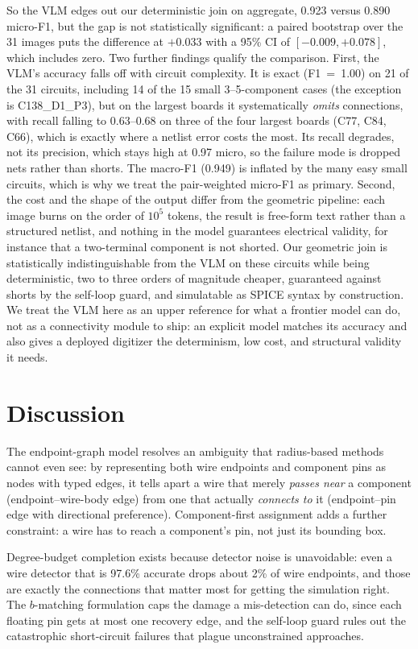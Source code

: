 \documentclass{ieeeaccess}
\begin{document}
So the VLM edges out our deterministic join on aggregate, 0.923 versus 0.890 micro-F1, but the gap is not statistically significant: a paired bootstrap over the 31 images puts the difference at $+0.033$ with a 95\% CI of $[-0.009, +0.078]$, which includes zero. Two further findings qualify the comparison. First, the VLM's accuracy falls off with circuit complexity. It is exact (F1~=~1.00) on 21 of the 31 circuits, including 14 of the 15 small 3--5-component cases (the exception is C138\_D1\_P3), but on the largest boards it systematically \emph{omits} connections, with recall falling to 0.63--0.68 on three of the four largest boards (C77, C84, C66), which is exactly where a netlist error costs the most. Its recall degrades, not its precision, which stays high at 0.97 micro, so the failure mode is dropped nets rather than shorts. The macro-F1 (0.949) is inflated by the many easy small circuits, which is why we treat the pair-weighted micro-F1 as primary. Second, the cost and the shape of the output differ from the geometric pipeline: each image burns on the order of $10^5$ tokens, the result is free-form text rather than a structured netlist, and nothing in the model guarantees electrical validity, for instance that a two-terminal component is not shorted. Our geometric join is statistically indistinguishable from the VLM on these circuits while being deterministic, two to three orders of magnitude cheaper, guaranteed against shorts by the self-loop guard, and simulatable as SPICE syntax by construction. We treat the VLM here as an upper reference for what a frontier model can do, not as a connectivity module to ship: an explicit model matches its accuracy and also gives a deployed digitizer the determinism, low cost, and structural validity it needs.

\section{Discussion}

The endpoint-graph model resolves an ambiguity that radius-based methods cannot even see: by representing both wire endpoints and component pins as nodes with typed edges, it tells apart a wire that merely \emph{passes near} a component (endpoint--wire-body edge) from one that actually \emph{connects to} it (endpoint--pin edge with directional preference). Component-first assignment adds a further constraint: a wire has to reach a component's pin, not just its bounding box.

Degree-budget completion exists because detector noise is unavoidable: even a wire detector that is 97.6\% accurate drops about 2\% of wire endpoints, and those are exactly the connections that matter most for getting the simulation right. The $b$-matching formulation caps the damage a mis-detection can do, since each floating pin gets at most one recovery edge, and the self-loop guard rules out the catastrophic short-circuit failures that plague unconstrained approaches.
\end{document}
